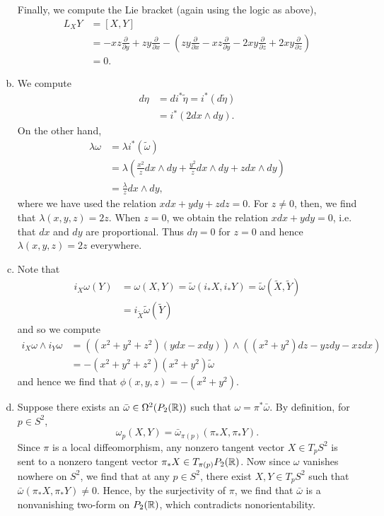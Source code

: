 \documentclass{../mathnotes}
\begin{document}
\begin{enumerate}[(a)]
        Finally, we compute the Lie bracket (again using the logic as above),
        \begin{align*}
            L_XY &= [X,Y]\\
            &=-xz\frac{\partial}{\partial y}+zy\frac{\partial}{\partial x}-\left( zy\frac{\partial}{\partial x}-xz\frac{\partial}{\partial y}-2xy\frac{\partial}{\partial z}+2xy\frac{\partial}{\partial z} \right)\\
            &=0.
        \end{align*}
    \item We compute
        \begin{align*}
            d\eta &= di^*\tilde\eta = i^*(d\tilde\eta)\\
            &=i^*(2dx\wedge dy).
        \end{align*}
        On the other hand,
        \begin{align*}
            \lambda\omega &= \lambda i^*(\tilde\omega)\\
            &= \lambda\left(\frac{x^2}{z}dx\wedge dy + \frac{y^2}{z}dx\wedge dy+zdx\wedge dy\right)\\
            &= \frac{\lambda}{z} dx\wedge dy,
        \end{align*}
        where we have used the relation $xdx+ydy+zdz=0$. For $z\neq 0$, then, we find that $\lambda(x,y,z)=2z$.
        When $z=0$, we obtain the relation $xdx+ydy=0$, i.e. that $dx$ and $dy$ are proportional.
        Thus $d\eta=0$ for $z=0$ and hence $\lambda(x,y,z)=2z$ everywhere.
    \item Note that 
        \begin{align*}
            i_X\omega(Y) &= \omega(X,Y)=\tilde\omega(i_*X,i_*Y)=\tilde\omega(\tilde X,\tilde Y)\\
            &=i_{\tilde X}\tilde\omega(\tilde Y)
        \end{align*}
        and so we compute
        \begin{align*}
            i_X\omega\wedge i_Y\omega &= \left( (x^2+y^2+z^2)(ydx-xdy) \right)\wedge\left( (x^2+y^2)dz-yzdy-xzdx \right)\\
            &=-(x^2+y^2+z^2)(x^2+y^2)\tilde\omega
        \end{align*}
        and hence we find that $\phi(x,y,z)=-(x^2+y^2)$.
    \item Suppose there exists an $\bar\omega\in\Omega^2(P_2(\mathbb{R}))$ such that $\omega=\pi^*\bar\omega$.
        By definition, for $p\in S^2$,
        \[\omega_p(X,Y)=\bar\omega_{\pi(p)}(\pi_*X,\pi_*Y).\]
        Since $\pi$ is a local diffeomorphism, any nonzero tangent vector $X\in T_pS^2$ is sent to a nonzero
        tangent vector $\pi_*X\in T_{\pi(p)}P_2(\mathbb{R})$.
        Now since $\omega$ vanishes nowhere on $S^2$, we find that at any $p\in S^2$, there exist $X,Y\in T_pS^2$
        such that $\bar\omega(\pi_*X,\pi_*Y)\neq0$. Hence, by the surjectivity of $\pi$, we find that $\bar\omega$
        is a nonvanishing two-form on $P_2(\mathbb{R})$, which contradicts nonorientability.
\end{enumerate}
\end{document}

